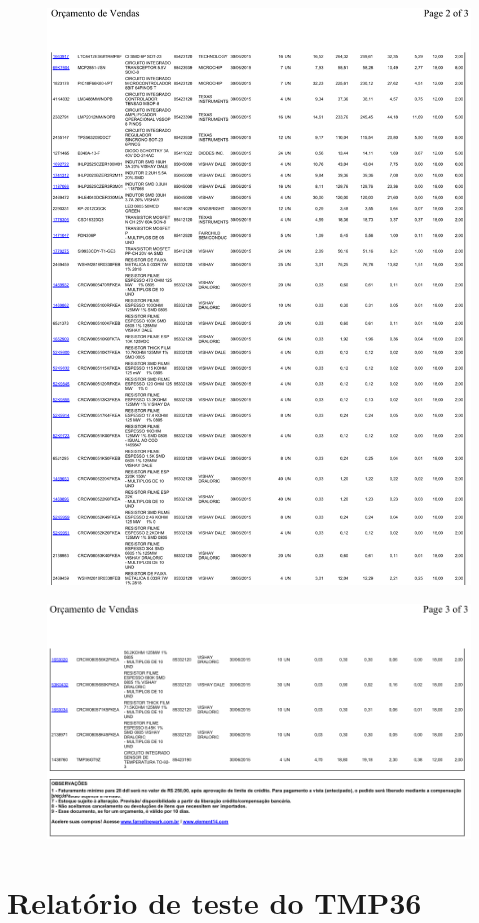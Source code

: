 \documentclass[
	12pt,				%
	openright,			%
	oneside,			%
	a4paper,			%
	english,			%
	french,				%
	spanish,			%
	brazil,				%
	oldfontcommands
	]{abntex2}
\begin{document}
\begin{anexosenv}
	\begin{figure}[th]
		\centering
		\includegraphics[width=0.9\linewidth]{./anexos/Pedido1898452}	
	\end{figure}
	
	\begin{figure}[th]
		\centering
		\includegraphics[width=0.9\linewidth]{./anexos/Pedido1898453}	
	\end{figure}
	
\chapter[Relatório de teste do TMP36]{Relatório de teste do TMP36}	
	

\end{anexosenv}
\end{document}
